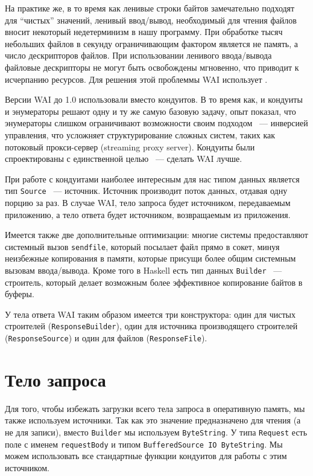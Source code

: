 На практике же, в то время как ленивые строки байтов замечательно подходят для ``чистых'' значений, 
ленивый ввод/вывод, необходимый для чтения файлов вносит некоторый
недетерминизм в нашу программу. При обработке тысяч небольших файлов в секунду ограничивающим
фактором является не память, а число дескрипторов файлов. При использовании ленивого
ввода/вывода файловые дескрипторы не могут быть освобождены мгновенно, что приводит к
исчерпанию ресурсов. Для решения этой проблеммы WAI использует  .

\begin{remark}
Версии WAI до 1.0 использовали   вместо кондуитов. В то время как, и кондуиты
и энумераторы решают одну и ту же самую базовую задачу, опыт показал, что энумераторы слишком
ограничивают возможности своим подходом ~--- инверсией управления, что усложняет структурирование
сложных систем, таких как потоковый прокси-сервер (streaming proxy server). Кондуиты были спроектированы
с единственной целью ~--- сделать WAI лучше.
\end{remark}

При работе с кондуитами наиболее интересным для нас типом данных является тип \lstinline!Source! ~--- источник. Источник производит
поток данных, отдавая одну порцию за раз. В случае WAI, тело запроса будет источником,
передаваемым приложению, а тело ответа будет источником, возвращаемым из приложения.

Имеется также две дополнительные оптимизации: многие системы предоставляют системный вызов \lstinline!sendfile!, который
посылает файл прямо в сокет, минуя неизбежные копирования в памяти, которые присущи
более общим системным вызовам ввода/вывода. Кроме того в Haskell есть тип данных
\lstinline!Builder! ~--- строитель, который делает возможным более эффективное копирование
байтов в буферы.

У тела ответа WAI таким образом имеется три конструктора: один для чистых строителей
(\lstinline!ResponseBuilder!), один для источника производящего строителей (\lstinline!ResponseSource!) и
один для файлов (\lstinline!ResponseFile!).

\section {Тело запроса}

Для того, чтобы избежать загрузки всего тела запроса в оперативную память, мы также используем
источники. Так как это значение предназначено для чтения (а не для записи), вместо \lstinline!Builder! мы используем
\lstinline!ByteString!. У типа \lstinline!Request! есть
поле с именем \lstinline!requestBody! и типом \lstinline!BufferedSource IO ByteString!.
Мы можем использовать все стандартные функции кондуитов для работы с этим источником.

